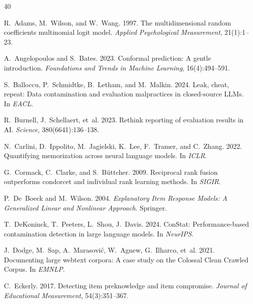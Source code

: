\documentclass[11pt,a4paper]{article}
\begin{document}
\begin{thebibliography}{40}

R.~Adams, M.~Wilson, and W.~Wang. 1997. The multidimensional random coefficients multinomial logit model. \emph{Applied Psychological Measurement}, 21(1):1--23.

A.~Angelopoulos and S.~Bates. 2023. Conformal prediction: A gentle introduction. \emph{Foundations and Trends in Machine Learning}, 16(4):494--591.

S.~Balloccu, P.~Schmidtke, B.~Letham, and M.~Malkin. 2024. Leak, cheat, repeat: Data contamination and evaluation malpractices in closed-source LLMs. In \emph{EACL}.

R.~Burnell, J.~Schellaert, et~al. 2023. Rethink reporting of evaluation results in AI. \emph{Science}, 380(6641):136--138.

N.~Carlini, D.~Ippolito, M.~Jagielski, K.~Lee, F.~Tramer, and C.~Zhang. 2022. Quantifying memorization across neural language models. In \emph{ICLR}.

G.~Cormack, C.~Clarke, and S.~B\"{u}ttcher. 2009. Reciprocal rank fusion outperforms condorcet and individual rank learning methods. In \emph{SIGIR}.

P.~De~Boeck and M.~Wilson. 2004. \emph{Explanatory Item Response Models: A Generalized Linear and Nonlinear Approach}. Springer.

T.~DeKoninck, T.~Peeters, L.~Shou, J.~Davis. 2024. ConStat: Performance-based contamination detection in large language models. In \emph{NeurIPS}.

J.~Dodge, M.~Sap, A.~Marasovi\'{c}, W.~Agnew, G.~Ilharco, et~al. 2021. Documenting large webtext corpora: A case study on the Colossal Clean Crawled Corpus. In \emph{EMNLP}.

C.~Eckerly. 2017. Detecting item preknowledge and item compromise. \emph{Journal of Educational Measurement}, 54(3):351--367.


\end{thebibliography}
\end{document}
